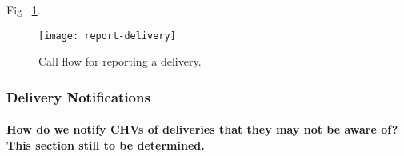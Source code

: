 Fig ~\ref{fig:delivery}.
\begin{figure}[]
	\begin{center}
	\texttt{[image: report-delivery]}
	\end{center}
	\caption{Call flow for reporting a delivery.}
	\label{fig:delivery}
\end{figure}

\subsubsection{Delivery Notifications}
\paragraph{How do we notify CHVs of deliveries that they may not be aware of? This section still to be determined.}
